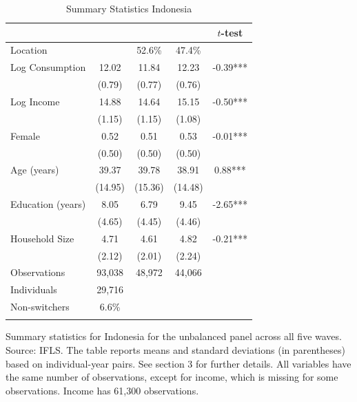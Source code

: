 \begin{table}[htbp] \centering \caption{Summary Statistics Indonesia}\label{tab:summary_stats_IDN_unb} \begin{threeparttable} \begin{tabular}{l cccc} \toprule
 &  &  &  & $t$-test \\
\midrule
Location &  &   52.6\% &   47.4\% &  \\  \addlinespace \addlinespace
Log Consumption & 12.02 & 11.84 & 12.23 & -0.39*** \\
 & (0.79) & (0.77) & (0.76) &  \\  \addlinespace
Log Income & 14.88 & 14.64 & 15.15 & -0.50*** \\
 & (1.15) & (1.15) & (1.08) &  \\  \addlinespace
Female & 0.52 & 0.51 & 0.53 & -0.01*** \\
 & (0.50) & (0.50) & (0.50) &  \\  \addlinespace
Age (years) & 39.37 & 39.78 & 38.91 & 0.88*** \\
 & (14.95) & (15.36) & (14.48) &  \\  \addlinespace
Education (years) & 8.05 & 6.79 & 9.45 & -2.65*** \\
 & (4.65) & (4.45) & (4.46) &  \\  \addlinespace
Household Size & 4.71 & 4.61 & 4.82 & -0.21*** \\
 & (2.12) & (2.01) & (2.24) &  \\  \addlinespace


\cmidrule{2-5}
Observations & 93,038 & 48,972 & 44,066 &  \\  \addlinespace
Individuals & 29,716 &  &  &  \\
Non-switchers &    6.6\% &  &  &  \\  \addlinespace
\bottomrule \end{tabular} \begin{tablenotes}[flushleft] \footnotesize \item{Summary statistics for Indonesia for the unbalanced panel across all five waves. Source: IFLS. The table reports means and standard deviations (in parentheses) based on individual-year pairs. See section 3 for further details. All variables have the same number of observations, except for income, which is missing for some observations. Income has 61,300 observations.} \end{tablenotes} \end{threeparttable} \end{table}